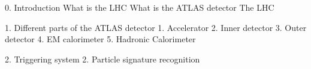 0. Introduction
    What is the LHC
    What is the ATLAS detector
    The LHC


1. Different parts of the ATLAS detector 
    1. Accelerator 
    2. Inner detector
    3. Outer detector
    4. EM calorimeter
    5. Hadronic Calorimeter

2. Triggering system 
2. Particle signature recognition
